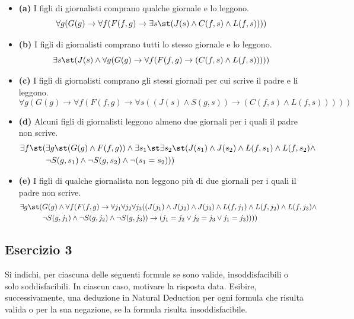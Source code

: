 \begin{itemize}
    \item \textbf{(a)} I figli di giornalisti comprano qualche giornale e lo leggono.
    \[ \forall g(G(g)\rightarrow\forall f(F(f,g)\rightarrow \exists s\st (J(s)\wedge C(f,s)\wedge L(f,s)))) \]
    
    \item \textbf{(b)} I figli di giornalisti comprano tutti lo stesso giornale e lo leggono.
    \[ \exists s\st (J(s)\wedge\forall g(G(g)\rightarrow\forall f(F(f,g)\rightarrow(C(f,s)\wedge L(f,s))))) \]
    
    \item \textbf{(c)} I figli di giornalisti comprano gli stessi giornali per cui scrive il padre e li leggono.
    \[ \forall g(G(g)\rightarrow\forall f(F(f,g)\rightarrow\forall s((J(s)\wedge S(g,s))\rightarrow(C(f,s)\wedge L(f,s))))) \]
    
    \item \textbf{(d)} Alcuni figli di giornalisti leggono almeno due giornali per i quali il padre non scrive.
    \begin{align*} 
    \exists f\st (&\exists g\st (G(g)\wedge F(f,g))\wedge \exists s_1\st \exists s_2\st (J(s_1)\wedge J(s_2)\wedge L(f,s_1)\wedge L(f,s_2)\wedge \\ 
    & \neg S(g,s_1)\wedge\neg S(g,s_2)\wedge\neg(s_1=s_2))) 
    \end{align*}
    
    \item \textbf{(e)} I figli di qualche giornalista non leggono più di due giornali per i quali il padre non scrive.
    \begin{align*}
    \exists g\st (&G(g)\wedge\forall f(F(f,g)\rightarrow\forall j_1\forall j_2\forall j_3((J(j_1)\wedge J(j_2)\wedge J(j_3)\wedge L(f,j_1)\wedge L(f,j_2)\wedge L(f,j_3)\wedge \\
    & \neg S(g,j_1)\wedge\neg S(g,j_2)\wedge\neg S(g,j_3))\rightarrow (j_1=j_2 \vee j_2=j_3 \vee j_1=j_3))))
    \end{align*}
\end{itemize}

\vspace{1cm}
\subsection*{Esercizio 3}

Si indichi, per ciascuna delle seguenti formule se sono valide, insoddisfacibili o solo soddisfacibili. In ciascun caso, motivare la risposta data.
Esibire, successivamente, una deduzione in Natural Deduction per ogni formula che risulta valida o per la sua negazione, se la formula risulta insoddisfacibile.


